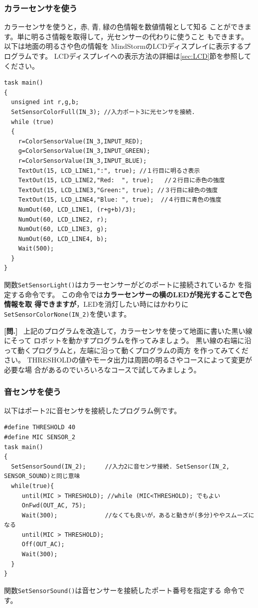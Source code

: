 \documentclass[11pt]{jarticle}
\makeatletter
\newcounter{qnum}[section]
\def\theqnum{問\thesection.\the\c@qnum}
\def\question{\refstepcounter{qnum}%
  \vspace{3mm}\noindent\textbf{[\theqnum]}~}
\makeatother
\begin{document}
\subsubsection{カラーセンサを使う}
カラーセンサを使うと，赤, 青, 緑の色情報を数値情報として知る
ことができます。単に明るさ情報を取得して，光センサーの代わりに使うこと
もできます。
以下は地面の明るさや色の情報を
MindStormのLCDディスプレイに表示するプログラムです。
LCDディスプレイへの表示方法の詳細は\ref{sec:LCD}節を参照してください。
\begin{screen}{\small
\begin{verbatim}
task main() 
{ 
  unsigned int r,g,b;
  SetSensorColorFull(IN_3); //入力ポート3に光センサを接続. 
  while (true) 
  { 
    r=ColorSensorValue(IN_3,INPUT_RED);
    g=ColorSensorValue(IN_3,INPUT_GREEN);
    r=ColorSensorValue(IN_3,INPUT_BLUE);
    TextOut(15, LCD_LINE1,":", true); //１行目に明るさ表示
    TextOut(15, LCD_LINE2,"Red:  ", true);   //２行目に赤色の強度
    TextOut(15, LCD_LINE3,"Green:", true); //３行目に緑色の強度
    TextOut(15, LCD_LINE4,"Blue: ", true);  //４行目に青色の強度
    NumOut(60, LCD_LINE1, (r+g+b)/3);
    NumOut(60, LCD_LINE2, r);
    NumOut(60, LCD_LINE3, g);
    NumOut(60, LCD_LINE4, b);
    Wait(500);
  } 
} 
\end{verbatim}}
\end{screen}
関数\verb|SetSensorLight()|はカラーセンサーがどのポートに接続されているか
を指定する命令です。
この命令では\textbf{カラーセンサーの横のLEDが発光することで色情報を取
  得できますが}，LEDを消灯したい時にはかわりに
\verb|SetSensorColorNone(IN_2)|を使います。



\question
上記のプログラムを改造して，カラーセンサを使って地面に書いた黒い線にそって
ロボットを動かすプログラムを作ってみましょう。
黒い線の右端に沿って動くプログラムと，左端に沿って動くプログラムの両方
を作ってみてください。
THRESHOLDの値やモータ出力は周囲の明るさやコースによって変更が必要な場
合があるのでいろいろなコースで試してみましょう。

\subsubsection{音センサを使う}
以下はポート2に音センサを接続したプログラム例です。

\begin{screen}{\small
\begin{verbatim}
#define THRESHOLD 40 
#define MIC SENSOR_2 
task main() 
{ 
  SetSensorSound(IN_2); 　 　//入力2に音センサ接続. SetSensor(IN_2, SENSOR_SOUND)と同じ意味
  while(true){ 
     until(MIC > THRESHOLD); //while (MIC<THRESHOLD); でもよい
     OnFwd(OUT_AC, 75); 
     Wait(300);  　　　　　   //なくても良いが，あると動きが(多分)ややスムーズになる
     until(MIC > THRESHOLD); 
     Off(OUT_AC); 
     Wait(300); 
  } 
} 
\end{verbatim}}
\end{screen}
関数\verb|SetSensorSound()|は音センサーを接続したポート番号を指定する
命令です。
\end{document}
